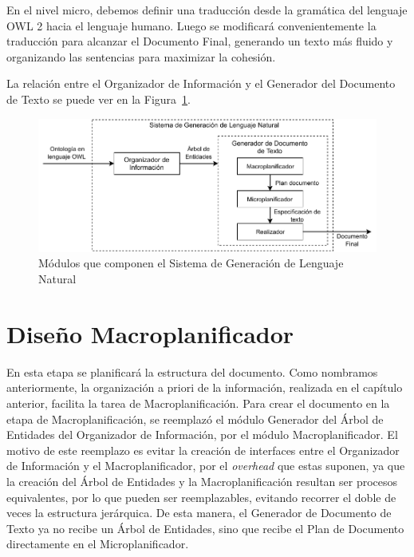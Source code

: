 En el nivel micro, debemos definir una traducción desde la gramática del lenguaje OWL 2 hacia el lenguaje humano. Luego se modificará convenientemente la traducción para alcanzar el Documento Final, generando un texto más fluido y organizando las sentencias para maximizar la cohesión.

La relación entre el Organizador de Información y el Generador del Documento de Texto se puede ver en la Figura~\ref{fig:modulos_sgln}.

\begin{figure}
    \centering
    \includegraphics{img/generacion_documento/modulos_SGLN.pdf}
    \caption{Módulos que componen el Sistema de Generación de Lenguaje Natural}
    \label{fig:modulos_sgln}
\end{figure}





\section{Diseño Macroplanificador}
\label{sec:macro_planning}
En esta etapa se planificará la estructura del documento. Como nombramos anteriormente, la organización a priori de la información, realizada en el capítulo anterior, facilita la tarea de Macroplanificación. Para crear el documento en la etapa de Macroplanificación, se reemplazó el módulo Generador del Árbol de Entidades del Organizador de Información, por el módulo Macroplanificador. El motivo de este reemplazo es evitar la creación de interfaces entre el Organizador de Información y el Macroplanificador, por el \emph{overhead} que estas suponen, ya que la creación del Árbol de Entidades y la Macroplanificación resultan ser procesos equivalentes, por lo que pueden ser reemplazables, evitando recorrer el doble de veces la estructura jerárquica. De esta manera, el Generador de Documento de Texto ya no recibe un Árbol de Entidades, sino que recibe el Plan de Documento directamente en el Microplanificador. 

